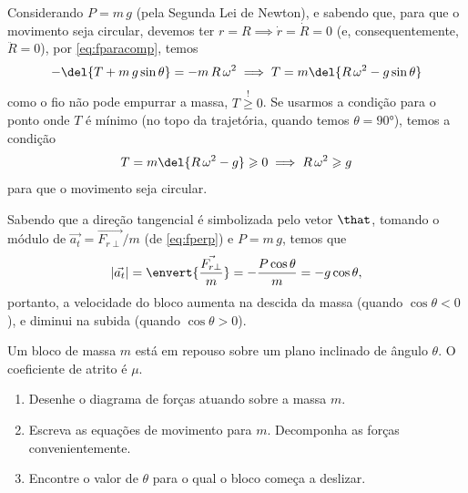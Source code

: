 \documentclass[]{IMTexam}
\begin{document}
\begin{questions}
\begin{solution}
\begin{unindent}
			Considerando $ P=m\,g $ (pela Segunda Lei de Newton), e sabendo que, para que o movimento seja circular, devemos ter $ r=R\implies \dot{r}=\dot{R}=0 $ (e, consequentemente, $ \ddot{R}=0 $), por \ref{eq:fparacomp}, temos
			\[ -\del{T+m\,g\sin\theta}=-m\,R\,\omega^{2}\implies
				T=m\del{R\,\omega^{2}-g\sin\theta} \]
			como o fio não pode empurrar a massa, $ T\stackrel{!}{\geqslant}0 $. Se usarmos a condição para o ponto onde $ T $ é mínimo (no topo da trajetória, quando temos $ \theta=\ang{90} $), temos a condição
			\begin{equation}\label{eq:tCond}
				T=m\del{R\,\omega^{2}-g}\geqslant0 \implies R\,\omega^{2}\geqslant g
			\end{equation}
			para que o movimento seja circular.

			\item Sabendo que a direção tangencial é simbolizada pelo vetor $ \that $, tomando o módulo de
			$\vec{a_t}=\vec{F_{r\perp}}/m$ (de \ref{eq:fperp}) e $ P=m\,g $, temos que
			\[ |\vec{a_t}|=\envert{\dfrac{\vec{F_{r\perp}}}{m}}=-\dfrac{P\cos\theta}{m}=-g\cos\theta, \]
			portanto, a velocidade do bloco aumenta na descida da massa (quando $ \cos\theta<0 $), e diminui na subida (quando $ \cos\theta>0 $).
		\end{unindent}
	\end{solution}



	\question Um bloco de massa $ m $ está em repouso sobre um plano inclinado de ângulo $ \theta $. O coeficiente de atrito é $ \mu $.

	\begin{enumerate}[label=\alph*.]
		\item Desenhe o diagrama de forças atuando sobre a massa $ m $.
		\item Escreva as equações de movimento para $ m $. Decomponha as forças convenientemente.
		\item Encontre o valor de $\theta$ para o qual o bloco começa a deslizar.
	\end{enumerate}

	\begin{solution}

		\changelabel{(\alph*)}

		\topenum
		\begin{multi}

			\centering
			\begin{tikzpicture}[xscale=-1,scale=3]


\end{tikzpicture}
\end{multi}
\end{solution}
\end{questions}
\end{document}
